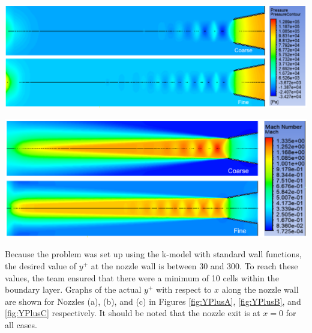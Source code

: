 \documentclass[12pt]{article} %
\begin{document}
\begin{center}
    \includegraphics[width = \linewidth]{GridCompareA_Pressure.PNG}
    \label{fig:gridcompareA_Pressure}
\end{center}
\clearpage
\begin{center}
    \includegraphics[width = \linewidth]{GridCompareA_Mach.PNG}
    \label{fig:gridcompareA_Mach}
\end{center}

Because the problem was set up using the k-\textepsilon\:model with standard wall functions, the desired value of $y^+$ at the nozzle wall is between 30 and 300. To reach these values, the team ensured that there were a minimum of 10 cells within the boundary layer. Graphs of the actual $y^+$ with respect to $x$ along the nozzle wall are shown for Nozzles (a), (b), and (c) in Figures \ref{fig:YPlusA}, \ref{fig:YPlusB}, and \ref{fig:YPlusC} respectively. It should be noted that the nozzle exit is at $x=0$ for all cases.
\end{document}
